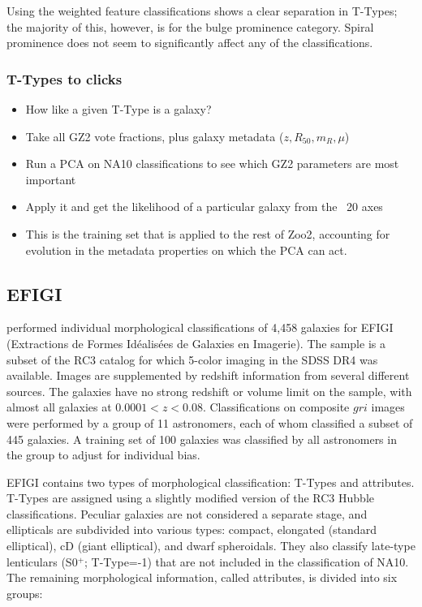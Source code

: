 \documentclass[useAMS,usenatbib]{mn2e}
\begin{document}
Using the weighted feature classifications shows a clear separation in T-Types; the majority of this, however, is for the bulge prominence category. Spiral prominence does not seem to significantly affect any of the classifications. 

\subsubsection{T-Types to clicks}

\begin{itemize}
	\item How like a given T-Type is a galaxy?
	\item Take all GZ2 vote fractions, plus galaxy metadata ($z, R_{50}, m_R, \mu$)
	\item Run a PCA on NA10 classifications to see which GZ2 parameters are most important
	\item Apply it and get the likelihood of a particular galaxy from the ~20 axes
	\item This is the training set that is applied to the rest of Zoo2, accounting for evolution in the metadata properties on which the PCA can act.
\end{itemize}

\subsection{EFIGI}

\citet{bai11} performed individual morphological classifications of 4,458 galaxies for EFIGI (Extractions de Formes Id\'ealis\'ees de Galaxies en Imagerie). The sample is a subset of the RC3 catalog for which 5-color imaging in the SDSS DR4 was available. Images are supplemented by redshift information from several different sources. The galaxies have no strong redshift or volume limit on the sample, with almost all galaxies at $0.0001<z<0.08$. Classifications on composite $gri$ images were performed by a group of 11 astronomers, each of whom classified a subset of 445 galaxies. A training set of 100 galaxies was classified by all astronomers in the group to adjust for individual bias. 

EFIGI contains two types of morphological classification: T-Types and attributes. T-Types are assigned using a slightly modified version of the RC3 Hubble classifications. Peculiar galaxies are not considered a separate stage, and ellipticals are subdivided into various types: compact, elongated (standard elliptical), cD (giant elliptical), and dwarf spheroidals. They also classify late-type lenticulars (S0$^+$; T-Type=-1) that are not included in the classification of NA10. The remaining morphological information, called attributes, is divided into six groups:
\end{document}
